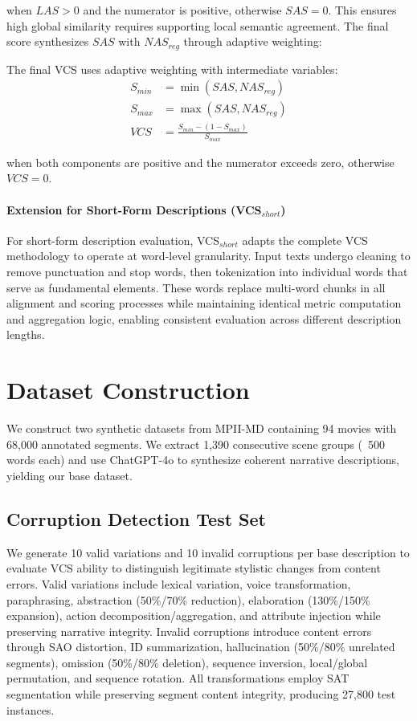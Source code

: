 \documentclass[letterpaper]{article} %
\begin{document}
when $LAS > 0$ and the numerator is positive, otherwise $SAS = 0$. This ensures high global similarity requires supporting local semantic agreement. The final score synthesizes $SAS$ with $NAS_{reg}$ through adaptive weighting:

The final VCS uses adaptive weighting with intermediate variables:
\begin{align}
S_{min} &= \min(SAS, NAS_{reg}) \label{eq:s_min} \\
S_{max} &= \max(SAS, NAS_{reg}) \label{eq:s_max} \\
VCS &= \frac{S_{min} - (1 - S_{max})}{S_{max}} \label{eq:vcs_final}
\end{align}

when both components are positive and the numerator exceeds zero, otherwise $VCS = 0$.

\paragraph{Extension for Short-Form Descriptions (VCS$_{short}$)}
For short-form description evaluation, VCS$_{short}$ adapts the complete VCS methodology to operate at word-level granularity. Input texts undergo cleaning to remove punctuation and stop words, then tokenization into individual words that serve as fundamental elements. These words replace multi-word chunks in all alignment and scoring processes while maintaining identical metric computation and aggregation logic, enabling consistent evaluation across different description lengths.

\section{Dataset Construction}

We construct two synthetic datasets from MPII-MD \citep{rohrbach2015dataset} containing 94 movies with 68,000 annotated segments. We extract 1,390 consecutive scene groups (~500 words each) and use ChatGPT-4o to synthesize coherent narrative descriptions, yielding our base dataset.

\subsection{Corruption Detection Test Set}
We generate 10 valid variations and 10 invalid corruptions per base description to evaluate VCS ability to distinguish legitimate stylistic changes from content errors. Valid variations include lexical variation, voice transformation, paraphrasing, abstraction (50\%/70\% reduction), elaboration (130\%/150\% expansion), action decomposition/aggregation, and attribute injection while preserving narrative integrity. Invalid corruptions introduce content errors through SAO distortion, ID summarization, hallucination (50\%/80\% unrelated segments), omission (50\%/80\% deletion), sequence inversion, local/global permutation, and sequence rotation. All transformations employ SAT segmentation while preserving segment content integrity, producing 27,800 test instances.
\end{document}
